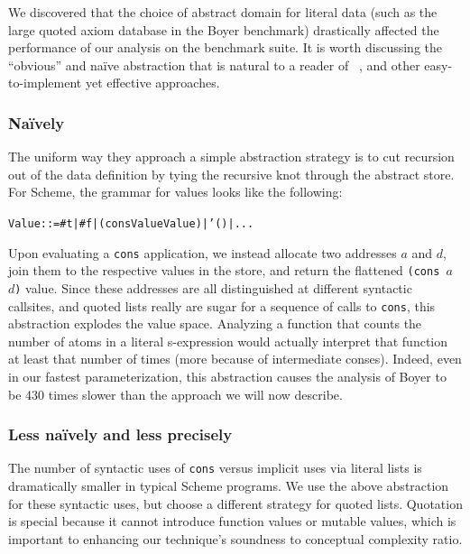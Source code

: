 \documentclass[preprint,onecolumn,9pt]{sigplanconf} %
\begin{document}
We discovered that the choice of abstract domain for literal data
(such as the large quoted axiom database in the Boyer benchmark)
drastically affected the performance of our analysis on the benchmark
suite. It is worth discussing the ``obvious'' and na\"ive abstraction
that is natural to a reader of
~\citep{dvanhorn:VanHorn2011Abstracting}, and other easy-to-implement
yet effective approaches.

\subsubsection{Na\"ively}

The uniform way they approach a simple abstraction strategy is to cut
recursion out of the data definition by tying the recursive knot
through the abstract store. For Scheme, the grammar for values looks like the following:

\begin{alltt}
Value ::= #t | #f | (cons Value Value) | '() | ...
\end{alltt}

Upon evaluating a {\tt cons} application, we instead allocate two
addresses $a$ and $d$, join them to the respective values in the
store, and return the flattened {\tt (cons $a$ $d$)} value. Since
these addresses are all distinguished at different syntactic
callsites, and quoted lists really are sugar for a sequence of calls
to {\tt cons}, this abstraction explodes the value space. Analyzing a
function that counts the number of atoms in a literal s-expression
would actually interpret that function at least that number of times
(more because of intermediate conses). Indeed, even in our fastest
parameterization, this abstraction causes the analysis of Boyer to be
430 times slower than the approach we will now describe.

\subsubsection{Less na\"ively and less precisely}

The number of syntactic uses of {\tt cons} versus implicit uses via
literal lists is dramatically smaller in typical Scheme programs. We
use the above abstraction for these syntactic uses, but choose a
different strategy for quoted lists. Quotation is special because it
cannot introduce function values or mutable values, which is important
to enhancing our technique's soundness to conceptual complexity ratio.
\end{document}
